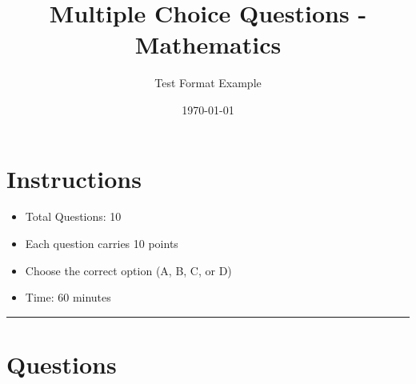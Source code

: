 \documentclass[12pt]{article}
\title{Multiple Choice Questions - Mathematics}
\author{Test Format Example}
\date{\today}
\begin{document}
\maketitle

\section*{Instructions}
\begin{itemize}
    \item Total Questions: 10
    \item Each question carries 10 points
    \item Choose the correct option (A, B, C, or D)
    \item Time: 60 minutes
\end{itemize}

\hrule
\vspace{1em}

\section*{Questions}
\end{document}
